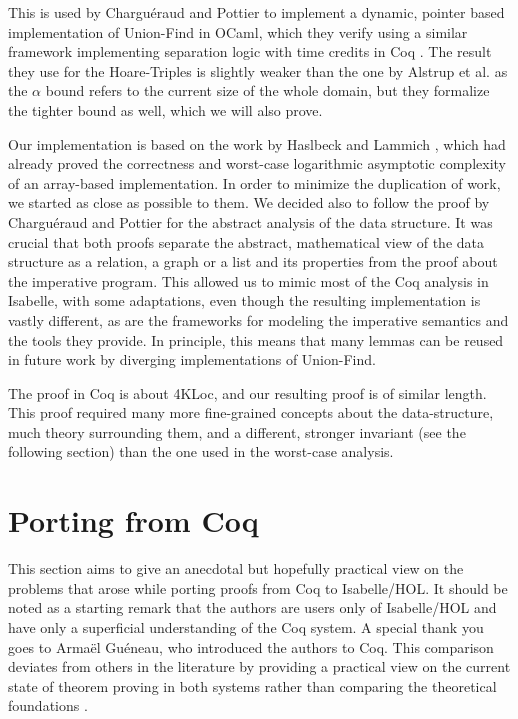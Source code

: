 \documentclass[headsepline,footsepline,footinclude=false,oneside,fontsize=11pt,paper=a4,listof=totoc,bibliography=totoc]{scrbook} %
\begin{document}
This is used by Charguéraud and Pottier to implement a dynamic, pointer based implementation of Union-Find in OCaml, which they verify using a similar framework implementing separation logic with time credits in Coq \cite{Gueneau18}. The result they use for the Hoare-Triples is slightly weaker than the one by Alstrup et al. as the $\alpha$ bound refers to the current size of the whole domain, but they formalize the tighter bound as well, which we will also prove.


Our implementation is based on the work by Haslbeck and Lammich \cite{HaslRef19}, which had already proved the correctness and worst-case logarithmic asymptotic complexity of an array-based implementation. In order to minimize the duplication of work, we started as close as possible to them. We decided also to follow the proof by Charguéraud and Pottier for the abstract analysis of the data structure. It was crucial that both proofs separate the abstract, mathematical view of the data structure as a relation, a graph or a list and its properties from the proof about the imperative program. This allowed us to mimic most of the Coq analysis in Isabelle, with some adaptations, even though the resulting implementation is vastly different, as are the frameworks for modeling the imperative semantics and the tools they provide. In principle, this means that many lemmas can be reused in future work by diverging implementations of Union-Find.

The proof in Coq is about 4KLoc, and our resulting proof is of similar length. This proof required many more fine-grained concepts about the data-structure, much theory surrounding them, and a different, stronger invariant (see the following section) than the one used in the worst-case analysis.


\section{Porting from Coq}

This section aims to give an anecdotal but hopefully practical view on the problems that arose while porting proofs from Coq to Isabelle/HOL. It should be noted as a starting remark that the authors are users only of Isabelle/HOL and have only a superficial understanding of the Coq system. A special thank you goes to Armaël Guéneau, who introduced the authors to Coq. This comparison deviates from others in the literature by providing a practical view on the current state of theorem proving in both systems rather than comparing the theoretical foundations \cite{Comparison}.
\end{document}
